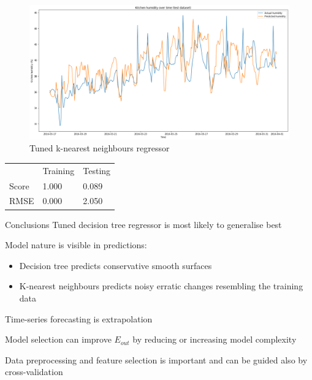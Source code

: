 \documentclass[9.5pt]{beamer}
\begin{document}
    \begin{frame}{}
        \begin{figure}
            \centering
            \includegraphics[width=\linewidth]{images/tuned_k}
            \caption{Tuned k-nearest neighbours regressor}
        \end{figure}
        \small
        \begin{table}
            \begin{tabular}{l l l}
                & Training & Testing \\
                Score & 1.000    & 0.089   \\
                RMSE  & 0.000    & 2.050
            \end{tabular}
        \end{table}
    \end{frame}

    \begin{frame}{Conclusions}
        Tuned decision tree regressor is most likely to generalise best

        Model nature is visible in predictions:
        \begin{itemize}
            \item Decision tree predicts conservative smooth surfaces
            \item K-nearest neighbours predicts noisy erratic changes resembling the training data
        \end{itemize}

        Time-series forecasting is extrapolation

        Model selection can improve $E_{out}$ by reducing or increasing model complexity

        Data preprocessing and feature selection is important and can be guided also by cross-validation
    \end{frame}
\end{document}
